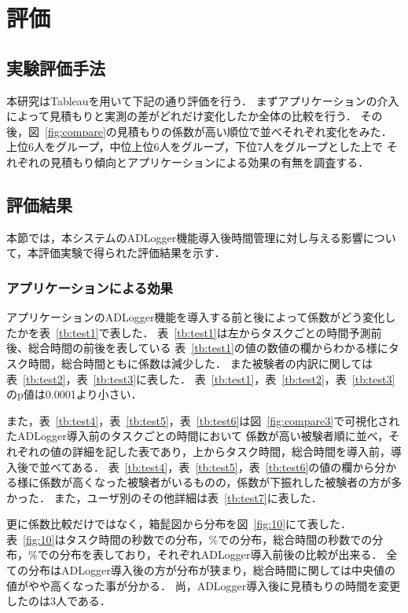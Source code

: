 \chapter{評価}
\section{実験評価手法}
本研究はTableau\cite{tableau}を用いて下記の通り評価を行う．
まずアプリケーションの介入によって見積もりと実測の差がどれだけ変化したか全体の比較を行う．
その後，図~\ref{fig:compare}の見積もりの係数が高い順位で並べそれぞれ変化をみた．
上位6人をグループ，中位上位6人をグループ，下位7人をグループとした上で
それぞれの見積もり傾向とアプリケーションによる効果の有無を調査する．

\section{評価結果}
本節では，本システムのADLogger機能導入後時間管理に対し与える影響について，本評価実験で得られた評価結果を示す．
\subsection{アプリケーションによる効果}
アプリケーションのADLogger機能を導入する前と後によって係数がどう変化したかを表~\ref{tb:test1}で表した．
表~\ref{tb:test1}は左からタスクごとの時間予測前後、総合時間の前後を表している
表~\ref{tb:test1}の値の数値の欄からわかる様にタスク時間，総合時間ともに係数は減少した．
また被験者の内訳に関しては表~\ref{tb:test2}，表~\ref{tb:test3}に表した．
表~\ref{tb:test1}，表~\ref{tb:test2}，表~\ref{tb:test3}のp値は0.0001より小さい．

また，表~\ref{tb:test4}，表~\ref{tb:test5}，表~\ref{tb:test6}は図~\ref{fig:compare3}で可視化されたADLogger導入前のタスクごとの時間において
係数が高い被験者順に並べ，それぞれの値の詳細を記した表であり，上からタスク時間，総合時間を導入前，導入後で並べてある．
表~\ref{tb:test4}，表~\ref{tb:test5}，表~\ref{tb:test6}の値の欄から分かる様に係数が高くなった被験者がいるものの，係数が下振れした被験者の方が多かった．
また，ユーザ別のその他詳細は表~\ref{tb:test7}に表した．

更に係数比較だけではなく，箱髭図から分布を図~\ref{fig:10}にて表した．
表~\ref{fig:10}はタスク時間の秒数での分布，\%での分布，総合時間の秒数での分布，\%での分布を表しており，それぞれADLogger導入前後の比較が出来る．
全ての分布はADLogger導入後の方が分布が狭まり，総合時間に関しては中央値の値がやや高くなった事が分かる．
尚，ADLogger導入後に見積もりの時間を変更したのは3人である．

